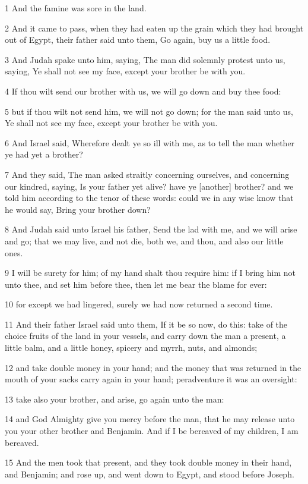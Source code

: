 \par 1 And the famine was sore in the land.
\par 2 And it came to pass, when they had eaten up the grain which they had brought out of Egypt, their father said unto them, Go again, buy us a little food.
\par 3 And Judah spake unto him, saying, The man did solemnly protest unto us, saying, Ye shall not see my face, except your brother be with you.
\par 4 If thou wilt send our brother with us, we will go down and buy thee food:
\par 5 but if thou wilt not send him, we will not go down; for the man said unto us, Ye shall not see my face, except your brother be with you.
\par 6 And Israel said, Wherefore dealt ye so ill with me, as to tell the man whether ye had yet a brother?
\par 7 And they said, The man asked straitly concerning ourselves, and concerning our kindred, saying, Is your father yet alive? have ye [another] brother? and we told him according to the tenor of these words: could we in any wise know that he would say, Bring your brother down?
\par 8 And Judah said unto Israel his father, Send the lad with me, and we will arise and go; that we may live, and not die, both we, and thou, and also our little ones.
\par 9 I will be surety for him; of my hand shalt thou require him: if I bring him not unto thee, and set him before thee, then let me bear the blame for ever:
\par 10 for except we had lingered, surely we had now returned a second time.
\par 11 And their father Israel said unto them, If it be so now, do this: take of the choice fruits of the land in your vessels, and carry down the man a present, a little balm, and a little honey, spicery and myrrh, nuts, and almonds;
\par 12 and take double money in your hand; and the money that was returned in the mouth of your sacks carry again in your hand; peradventure it was an oversight:
\par 13 take also your brother, and arise, go again unto the man:
\par 14 and God Almighty give you mercy before the man, that he may release unto you your other brother and Benjamin. And if I be bereaved of my children, I am bereaved.
\par 15 And the men took that present, and they took double money in their hand, and Benjamin; and rose up, and went down to Egypt, and stood before Joseph.
